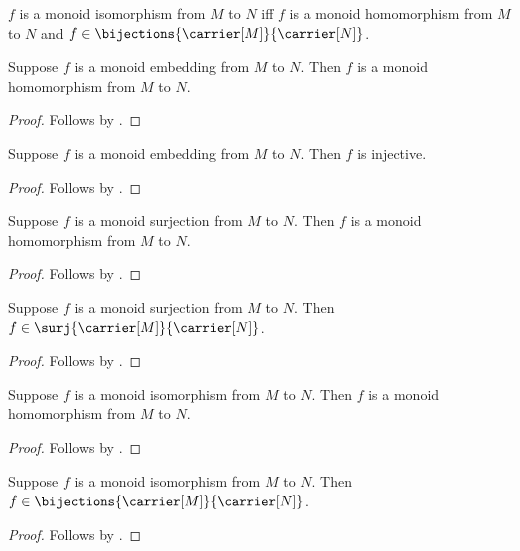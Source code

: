 \begin{definition}\label{monoid_isomorphism}
    $f$ is a monoid isomorphism from $M$ to $N$ iff
        $f$ is a monoid homomorphism from $M$ to $N$ and
        $f\in\bijections{\carrier[M]}{\carrier[N]}$.
\end{definition}

\begin{proposition}\label{monoid_embedding_is_hom}
    Suppose $f$ is a monoid embedding from $M$ to $N$.
    Then $f$ is a monoid homomorphism from $M$ to $N$.
\end{proposition}
\begin{proof}
    Follows by .
\end{proof}

\begin{proposition}\label{monoid_embedding_injective}
    Suppose $f$ is a monoid embedding from $M$ to $N$.
    Then $f$ is injective.
\end{proposition}
\begin{proof}
    Follows by .
\end{proof}

\begin{proposition}\label{monoid_surjection_is_hom}
    Suppose $f$ is a monoid surjection from $M$ to $N$.
    Then $f$ is a monoid homomorphism from $M$ to $N$.
\end{proposition}
\begin{proof}
    Follows by .
\end{proof}

\begin{proposition}\label{monoid_surjection_is_surjection}
    Suppose $f$ is a monoid surjection from $M$ to $N$.
    Then $f\in\surj{\carrier[M]}{\carrier[N]}$.
\end{proposition}
\begin{proof}
    Follows by .
\end{proof}

\begin{proposition}\label{monoid_isomorphism_is_hom}
    Suppose $f$ is a monoid isomorphism from $M$ to $N$.
    Then $f$ is a monoid homomorphism from $M$ to $N$.
\end{proposition}
\begin{proof}
    Follows by .
\end{proof}

\begin{proposition}\label{monoid_isomorphism_is_bijection}
    Suppose $f$ is a monoid isomorphism from $M$ to $N$.
    Then $f\in\bijections{\carrier[M]}{\carrier[N]}$.
\end{proposition}
\begin{proof}
    Follows by .
\end{proof}

